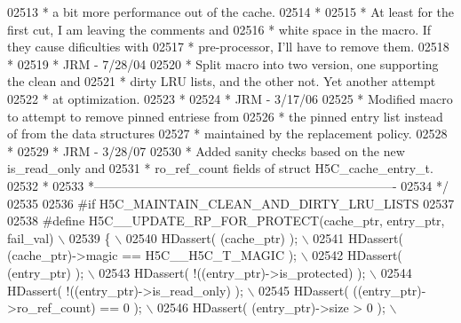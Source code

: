 \begin{DoxyCode}
02513 \textcolor{comment}{ *      a bit more performance out of the cache.}
02514 \textcolor{comment}{ *}
02515 \textcolor{comment}{ *      At least for the first cut, I am leaving the comments and}
02516 \textcolor{comment}{ *      white space in the macro.  If they cause dificulties with}
02517 \textcolor{comment}{ *      pre-processor, I'll have to remove them.}
02518 \textcolor{comment}{ *}
02519 \textcolor{comment}{ *      JRM - 7/28/04}
02520 \textcolor{comment}{ *      Split macro into two version, one supporting the clean and}
02521 \textcolor{comment}{ *      dirty LRU lists, and the other not.  Yet another attempt}
02522 \textcolor{comment}{ *      at optimization.}
02523 \textcolor{comment}{ *}
02524 \textcolor{comment}{ *      JRM - 3/17/06}
02525 \textcolor{comment}{ *      Modified macro to attempt to remove pinned entriese from}
02526 \textcolor{comment}{ *      the pinned entry list instead of from the data structures}
02527 \textcolor{comment}{ *      maintained by the replacement policy.}
02528 \textcolor{comment}{ *}
02529 \textcolor{comment}{ *      JRM - 3/28/07}
02530 \textcolor{comment}{ *      Added sanity checks based on the new is\_read\_only and}
02531 \textcolor{comment}{ *      ro\_ref\_count fields of struct H5C\_cache\_entry\_t.}
02532 \textcolor{comment}{ *}
02533 \textcolor{comment}{ *-------------------------------------------------------------------------}
02534 \textcolor{comment}{ */}
02535 
02536 \textcolor{preprocessor}{#if H5C\_MAINTAIN\_CLEAN\_AND\_DIRTY\_LRU\_LISTS}
02537 
02538 \textcolor{preprocessor}{#define H5C\_\_UPDATE\_RP\_FOR\_PROTECT(cache\_ptr, entry\_ptr, fail\_val)        \(\backslash\)}
02539 \textcolor{preprocessor}{\{                                                                         \(\backslash\)}
02540 \textcolor{preprocessor}{    HDassert( (cache\_ptr) );                                              \(\backslash\)}
02541 \textcolor{preprocessor}{    HDassert( (cache\_ptr)->magic == H5C\_\_H5C\_T\_MAGIC );                   \(\backslash\)}
02542 \textcolor{preprocessor}{    HDassert( (entry\_ptr) );                                              \(\backslash\)}
02543 \textcolor{preprocessor}{    HDassert( !((entry\_ptr)->is\_protected) );                             \(\backslash\)}
02544 \textcolor{preprocessor}{    HDassert( !((entry\_ptr)->is\_read\_only) );                             \(\backslash\)}
02545 \textcolor{preprocessor}{    HDassert( ((entry\_ptr)->ro\_ref\_count) == 0 );                         \(\backslash\)}
02546 \textcolor{preprocessor}{    HDassert( (entry\_ptr)->size > 0 );                                    \(\backslash\)}

\end{DoxyCode}
